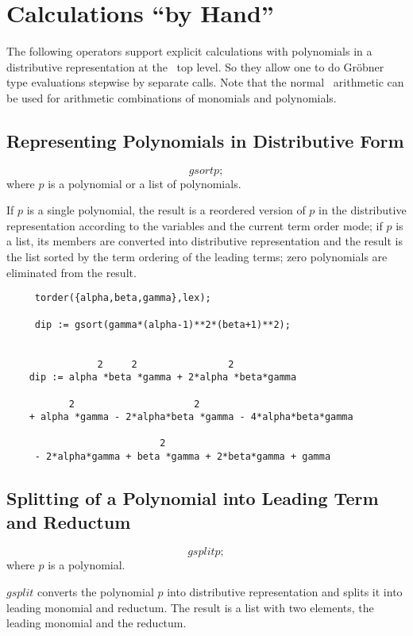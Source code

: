 \section{Calculations ``by Hand''}
The following operators support explicit calculations with
polynomials in a distributive representation at the \REDUCE \  top level.
So they allow one to do Gr\"obner type evaluations stepwise by
separate calls. Note that the normal \REDUCE \  arithmetic can be used
for arithmetic combinations of monomials and polynomials.

\subsection{Representing Polynomials in Distributive Form}
\[ gsort p; \]
where $p$ is a polynomial or a list of polynomials.

If $p$ is a single polynomial, the result is a reordered version of $p$
in the distributive representation according to the variables and the
current term order mode; if $p$ is a list, its members are converted
into distributive representation and the result is the list sorted by
the term ordering of the leading terms; zero polynomials are
eliminated from the result.

\begin{verbatim}
     torder({alpha,beta,gamma},lex);

     dip := gsort(gamma*(alpha-1)**2*(beta+1)**2);


                2     2                2
    dip := alpha *beta *gamma + 2*alpha *beta*gamma

           2                     2
    + alpha *gamma - 2*alpha*beta *gamma - 4*alpha*beta*gamma

                           2
     - 2*alpha*gamma + beta *gamma + 2*beta*gamma + gamma

 \end{verbatim}

\subsection{Splitting of a Polynomial into Leading Term and Reductum}
\[ gsplit p; \]
where $p$ is a polynomial.

$gsplit$ converts the polynomial $p$ into distributive representation
and splits it into leading monomial and reductum. The result is a list
with two elements, the leading monomial and the reductum.

